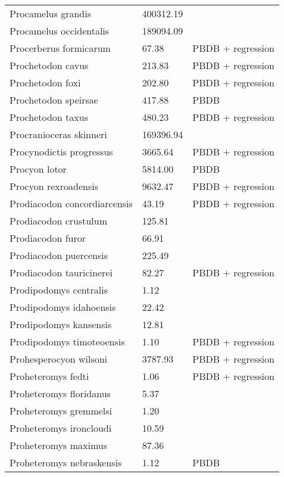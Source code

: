 \documentclass{article}
\begin{document}
\begin{center}
\begin{longtable}{p{} p{} p{}}
    Procamelus grandis & 400312.19 & \cite{Tomiya2013} \\ 
    Procamelus occidentalis & 189094.09 & \cite{Tomiya2013} \\ 
    Procerberus formicarum & 67.38 & PBDB + regression \\ 
    Prochetodon cavus & 213.83 & PBDB + regression \\ 
    Prochetodon foxi & 202.80 & PBDB + regression \\ 
    Prochetodon speirsae & 417.88 & PBDB \\ 
    Prochetodon taxus & 480.23 & PBDB + regression \\ 
    Procranioceras skinneri & 169396.94 & \cite{Tomiya2013} \\ 
    Procynodictis progressus & 3665.64 & PBDB + regression \\ 
    Procyon lotor & 5814.00 & PBDB \\ 
    Procyon rexroadensis & 9632.47 & PBDB + regression \\ 
    Prodiacodon concordiarcensis & 43.19 & PBDB + regression \\ 
    Prodiacodon crustulum & 125.81 & \cite{Lim2001} \\ 
    Prodiacodon furor & 66.91 & \cite{Scott1937} \\ 
    Prodiacodon puercensis & 225.49 & \cite{Mellett1969} \\ 
    Prodiacodon tauricinerei & 82.27 & PBDB + regression \\ 
    Prodipodomys centralis & 1.12 & \cite{Becker1981} \\ 
    Prodipodomys idahoensis & 22.42 & \cite{Tomiya2013} \\ 
    Prodipodomys kansensis & 12.81 & \cite{Tomiya2013} \\ 
    Prodipodomys timoteoensis & 1.10 & PBDB + regression \\ 
    Prohesperocyon wilsoni & 3787.93 & PBDB + regression \\ 
    Proheteromys fedti & 1.06 & PBDB + regression \\ 
    Proheteromys floridanus & 5.37 & \cite{Tomiya2013} \\ 
    Proheteromys gremmelsi & 1.20 & \cite{Becker1981} \\ 
    Proheteromys ironcloudi & 10.59 & \cite{Tomiya2013} \\ 
    Proheteromys maximus & 87.36 & \cite{Tomiya2013} \\ 
    Proheteromys nebraskensis & 1.12 & PBDB \\ 

\end{longtable}
\end{center}
\end{document}
